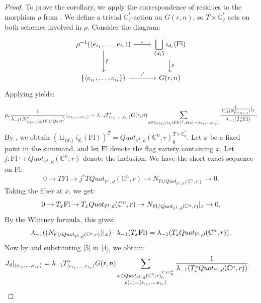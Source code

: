 \documentclass{amsart}
\begin{document}
    \begin{proof}
    To prove the corollary, we apply the correspondence of residues to the morphism $\rho$ from . We define a trivial $\mathbb{C}_q^*$-action on $G(r,n)$, so $T \times \mathbb{C}_q^*$ acts on both schemes involved in $\rho$. Consider the diagram:
    \begin{equation*}
    \begin{tikzcd} 
    \rho^{-1}(\langle e_{i_1}, \dots, e_{i_r}\rangle) 
        \ar[r, "\iota"] 
        \ar[d, "f"] 
    &  \displaystyle \bigsqcup_{\{d_i\}} i_{d_i}(\mathrm{Fl}) 
        \ar[d, "\rho"] \\
    \{\langle e_{i_1}, \dots, e_{i_r}\rangle\} 
        \ar[r, "\iota'"]
    & G(r,n)
\end{tikzcd}
\end{equation*}
Applying  yields: 
    
       \begin{equation}\label{4} 
\rho_*\frac{1}{\lambda_{-1}(N^*_{ \sqcup_{\{d_i\}} i_{d_i}(\mathrm{Fl})/Quot})}\arrowvert_{\langle e_{i_1}, \dots,e_{i_r} \rangle} = \lambda_{-1}T^*_{\langle e_{i_1}, \dots,e_{i_r} \rangle}G(r,n) \sum_{x \in  (\sqcup_{\{d_i\}} i_{d_i}(\mathrm{Fl}))^T,\rho(x)=\langle e_{i_1}, \dots,e_{i_r} \rangle}\frac{\frac{1}{\lambda_{-1}(N^*_{ \mathrm{Fl}/Quot})}\arrowvert_{x}}{\lambda_{-1}(T_{x}^* \mathrm{Fl})}.
\end{equation}
By , we obtain $(\sqcup_{\{d_i\}} i_{d_i}(\mathrm{Fl}))^T = Quot_{\mathbb{P}^1,d}(\mathbb{C}^n,r)^{T \times \mathbb{C}_q^*}_0$. Let $x$ be a fixed point in the summand, and let $\mathrm{Fl}$ denote the flag variety containing $x$. Let $j: \mathrm{Fl} \hookrightarrow Quot_{\mathbb{P}^1,d}(\mathbb{C}^n,r)$ denote the inclusion. We have the short exact sequence on $\mathrm{Fl}$: 
\[
0 \to T{\mathrm{Fl}} \to j^*T{Quot_{\mathbb{P}^1,d}(\mathbb{C}^n,r)} \to N_{ \mathrm{Fl}/{Quot_{\mathbb{P}^1,d}(\mathbb{C}^n,r)}} \to 0. 
\]
Taking the fiber at $x$, we get:
\[
0 \to T_x \mathrm{Fl} \to T_x{Quot_{\mathbb{P}^1,d}(\mathbb{C}^n,r)} \to N_{{\mathrm{Fl}}/{Quot_{\mathbb{P}^1,d}(\mathbb{C}^n,r)}}\arrowvert_{x} \to 0.
\]
By the Whitney formula, this gives:
\begin{equation} \label{5}
\lambda_{-1}((N_{{\mathrm{Fl}}/{Quot_{\mathbb{P}^1,d}(\mathbb{C}^n,r)}})\arrowvert_x) \cdot \lambda_{-1}(T_x{\mathrm{Fl}}) = \lambda_{-1}(T_x{Quot_{\mathbb{P}^1,d}(\mathbb{C}^n,r)}).
\end{equation}
Now by  and substituting \eqref{5} in \eqref{4}, we obtain:
\begin{align*}
J_d\arrowvert_{\langle e_{i_1}, \dots,e_{i_r} \rangle}
&= \lambda_{-1}T^*_{\langle e_{i_1},\dots,e_{i_r}\rangle}G(r,n)
\sum_{\substack{x \in Quot_{\mathbb{P}^1,d}(\mathbb{C}^n,r)_{0}^{T \times \mathbb{C}_q^*}\\ \rho(x) = \langle e_{i_1},\dots,e_{i_r} \rangle}}
\frac{1}{\lambda_{-1}(T^*_x{Quot_{\mathbb{P}^1,d}(\mathbb{C}^n,r)})}.
\end{align*}




\end{proof}
\end{document}
